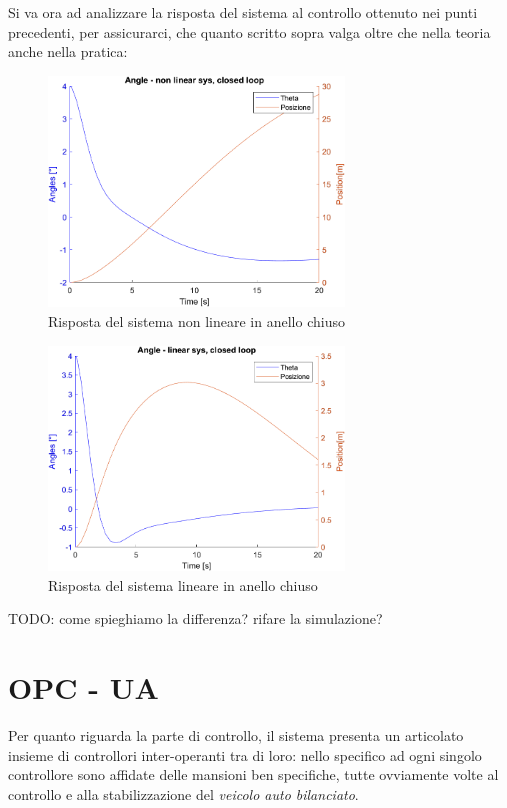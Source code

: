 Si va ora ad analizzare la risposta del sistema al controllo ottenuto nei punti precedenti, per assicurarci, che quanto scritto sopra valga oltre che nella teoria anche nella pratica:
\begin{figure}[H]
	\centering   	
	\includegraphics[width=0.7\textwidth]{Immagini/closed_loop_non_linear.png}
	\caption{Risposta del sistema non lineare in anello chiuso}
	\label{fig:closed_loop_non_linear_response}
\end{figure}
\begin{figure}[H]
	\centering   	
	\includegraphics[width=0.7\textwidth]{Immagini/closed_loop_linear.png}
	\caption{Risposta del sistema lineare in anello chiuso}
	\label{fig:closed_loop_non_linear_response}
\end{figure}
TODO: come spieghiamo la differenza? rifare la simulazione?

\chapter{OPC - UA}
Per quanto riguarda la parte di controllo, il sistema presenta un articolato insieme di controllori inter-operanti tra di loro: nello specifico ad ogni singolo controllore sono affidate delle mansioni ben specifiche, tutte ovviamente volte al controllo e alla stabilizzazione del \textit{veicolo auto bilanciato}.

